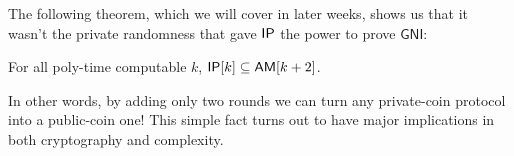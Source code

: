 \documentclass{article}
\begin{document}
The following theorem, which we will cover in later weeks, shows us that it wasn't the private randomness that gave $\mathsf{IP}$ the power to prove $\textsf{GNI}$:

\begin{theorem}
    For all poly-time computable $k$,
    $\mathsf{IP}[k] \subseteq \mathsf{AM}[k + 2]$.
\end{theorem}

In other words, by adding only two rounds we can turn any private-coin protocol into a public-coin one!
This simple fact turns out to have major implications in both cryptography and complexity. 
\end{document}

